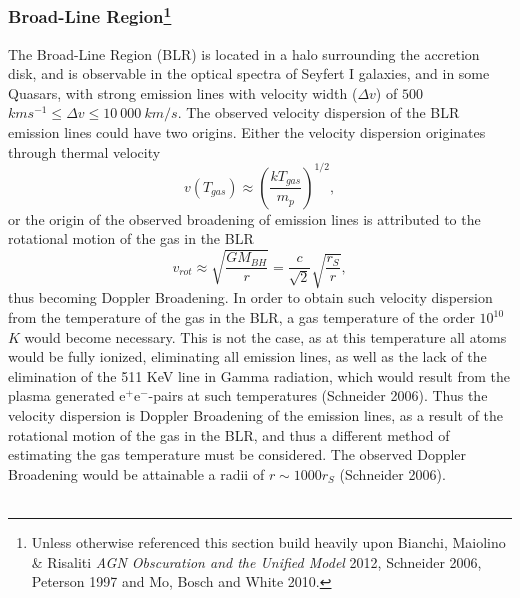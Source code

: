 \documentclass[a4paper, 12pt, twoside]{article}
\begin{document}
\subsubsection[Broad-Line Region]{Broad-Line Region\footnote{Unless otherwise referenced this section build heavily upon Bianchi, Maiolino \& Risaliti \emph{AGN Obscuration and the Unified Model} 2012, Schneider 2006, Peterson 1997 and Mo, Bosch and White 2010.}} \label{BLR}

The Broad-Line Region (BLR) is located in a halo surrounding the accretion disk, and is observable in the optical spectra of Seyfert I galaxies, and in some Quasars, with strong emission lines with velocity width ($\Delta v$) of $500$ $kms^{-1} \le \Delta v\le 10\ 000\ km/s$. The observed velocity dispersion of the BLR emission lines could have two origins. Either the velocity dispersion originates through thermal velocity
\begin{equation}
v(T_{gas}) \approx (\frac{kT_{gas}} {m_{p}})^{1/2},
\label{eq:v_gas_T}
\end{equation} 
or the origin of the observed broadening of emission lines is attributed to the rotational motion of the gas in the BLR
\begin{equation}
v_{rot} \approx \sqrt{\frac{GM_{BH}} {r}} = \frac{c}{\sqrt{2}}\sqrt{\frac{r_{S}}{r}},
\label{eq:v_gas_T}
\end{equation}
thus becoming Doppler Broadening. In order to obtain such velocity dispersion from the temperature of the gas in the BLR, a gas temperature of the order $10^{10}$ $K$ would become necessary. This is not the case, as at this temperature all atoms would be fully ionized, eliminating all emission lines, as well as the lack of the elimination of the 511 KeV line in Gamma radiation, which would result from the plasma generated e$^{+}$e$^{-}$-pairs at such temperatures (Schneider 2006). Thus the velocity dispersion is Doppler Broadening of the emission lines, as a result of the rotational motion of the gas in the BLR, and thus a different method of estimating the gas temperature must be considered. The observed Doppler Broadening would be attainable a radii of $r \sim 1000r_{S}$ (Schneider 2006). \\
\\
\end{document}

